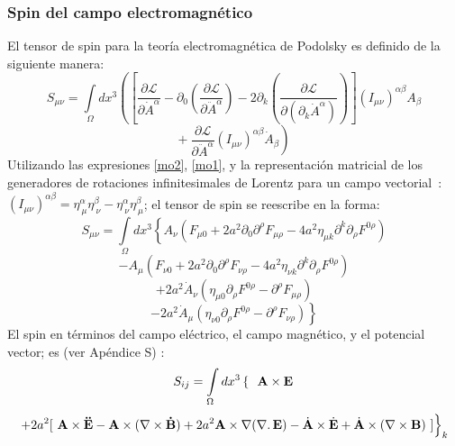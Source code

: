 \documentclass[a4paper,12pt]{article}
\begin{document}
\subsubsection{Spin del campo electromagnético}
El tensor de spin para la teoría electromagnética de Podolsky es definido de la siguiente manera:
\begin{equation}
S_{\mu\nu}=\int\limits_{\Omega}dx^{3}\left(\left[\frac{\partial \mathscr{L} }{\partial\dot A^\alpha}-\partial_{0}\left(\frac{\partial\mathscr{L} }{\partial\ddot A^\alpha}\right)-2\partial_{k}\left(\frac{\partial\mathscr{L} }{\partial(\partial_k\dot A^\alpha)} \right) \right](I_{\mu\nu})^{\alpha\beta}A_{\beta}\right.
\end{equation}
$$\left. +\ \frac{\partial\mathscr{L} }{\partial \ddot A^\alpha}(I_{\mu\nu})^{\alpha\beta}\dot A_\beta \right)$$
Utilizando las expresiones \eqref{mo2}, \eqref{mo1}, y la representación matricial de los generadores de rotaciones infinitesimales de Lorentz para un campo \mbox{vectorial \cite{greiner}: $(I_{\mu\nu})^{\alpha\beta}=\eta^{\alpha}_{\ \mu}\eta^{\beta}_{\ \nu}-\eta^{\alpha}_{\ \nu}\eta^{\beta}_{\ \mu}$;} el tensor de spin se reescribe en la forma: 
\begin{equation}
S_{\mu\nu}=\int\limits_{\Omega}dx^{3}\left\{A_\nu(F_{\mu0}+2a^2\partial_0\partial^\rho F_{\mu\rho}-4a^2\eta_{\mu k}\partial^k\partial_\rho F^{0\rho})   \right.
\end{equation}
$$\left.-A_\mu(F_{\nu0}+2a^2\partial_0\partial^\rho F_{\nu\rho}-4a^2\eta_{\nu k}\partial^k\partial_\rho F^{0\rho})\right.$$
\vspace{0,05cm}
$$\left.+2a^2\dot A_\nu(\eta_{\mu0}\partial_\rho F^{0\rho}-\partial^\rho F_{\mu\rho})\right.$$
\vspace{0,05cm}
$$\left.-2a^2\dot A_\mu(\eta_{\nu0}\partial_\rho F^{0\rho}-\partial^\rho F_{\nu\rho})\right\}$$
El spin en términos del campo eléctrico, el campo magnético, y el potencial vector; es (ver Apéndice S) \cite{greiner}:
\begin{equation}
S_{ij}=\int\limits_{\Omega}dx^{3}\left\{\ \ {\bf A}\times{\bf E} \right. 
\label{spinpo}
\end{equation}
$$\left.+2a^2[\ {\bf A}\times{\bf \ddot E}-{\bf A}\times(\nabla\times {\bf \dot B})+2a^2{\bf A}\times\nabla(\nabla\ldotp{\bf E})-\dot{{\bf A}}\times\dot{{\bf E}}+\dot{{\bf A}}\times(\nabla\times{\bf B})\ ]\right\}_k$$
\end{document}
